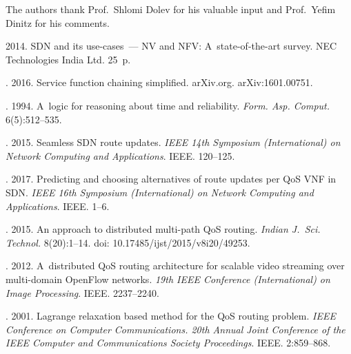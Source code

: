 \begin{multicols}{2}


The authors thank Prof.\ Shlomi Dolev 
for his valuable input and Prof.\ Yefim Dinitz for his comments.
 
\renewcommand{\bibname}{\protect\rmfamily References}


\vspace*{-6pt}

{\small\frenchspacing
{\baselineskip=10.35pt
\begin{thebibliography}{99}



 2014. SDN and its use-cases~--- NV and NFV:
A~state-of-the-art survey. NEC Technologies India Ltd. 25~p.

. 2016. 
Service function chaining simplified. {arXiv.org}. arXiv:1601.00751.

. 
1994. A~logic for reasoning about time and reliability. 
\textit{Form. Asp. Comput.} 6(5):512--535.

. 
2015. Seamless SDN route updates. \textit{IEEE 14th Symposium (International)
on Network Computing and Applications}. IEEE. 120--125.

. 
2017. Predicting and choosing alternatives of route updates per QoS VNF in SDN. 
\textit{IEEE 16th Symposium (International) on Network Computing and Applications}. 
IEEE. 1--6. 

. 2015. 
An approach to distributed multi-path QoS routing. 
\textit{Indian J.~Sci. Technol.} 8(20):1--14. 
doi: 10.17485/ijst/2015/v8i20/49253.

. 2012. 
A~distributed QoS routing architecture for scalable video streaming over multi-domain 
OpenFlow networks. \textit{19th IEEE Conference (International) on Image Processing}.
IEEE. 2237--2240.

. 2001. 
Lagrange relaxation based method
for the QoS routing problem. \textit{IEEE Conference on Computer Communications. 
20th Annual Joint Conference of the IEEE Computer and Communications Society
 Proceedings}. IEEE. 2:859--868.


\end{thebibliography}}}
\end{multicols}
